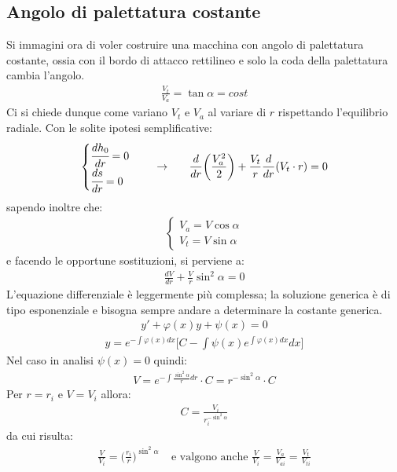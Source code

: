 \subsection{Angolo di palettatura costante}
Si immagini ora di voler costruire una macchina con angolo di palettatura costante, ossia con il bordo di attacco rettilineo e solo la coda della palettatura cambia l'angolo.
\begin{align*}
\boxed{\frac{V_t}{V_a} = \tan \alpha = cost}
\end{align*}
Ci si chiede dunque come variano $V_t$ e $V_a$ al variare di $r$ rispettando l'equilibrio radiale. Con le solite ipotesi semplificative:
\begin{align*}
\begin{cases}
\cfrac{dh_0}{dr} = 0\\
\cfrac{ds}{dr} = 0 
\end{cases} \;\;\;\; \rightarrow \;\;\;\;\;\;
\frac{d}{dr} \bigg(\frac{V_a^2}{2} \bigg) + \frac{V_t}{r} \frac{d}{dr}(V_t \cdot r) = 0
\end{align*}
sapendo inoltre che:
\begin{align*}
\begin{cases}
V_a = V \cos \alpha\\
V_t = V \sin \alpha
\end{cases}
\end{align*}
e facendo le opportune sostituzioni, si perviene a:
\begin{align*}
\frac{dV}{dr} + \frac{V}{r} \sin^2 \alpha = 0
\end{align*}
L'equazione differenziale è leggermente più complessa; la soluzione generica è di tipo esponenziale e bisogna sempre andare a determinare la costante generica.
\begin{align*}
y' + \varphi(x)y + \psi(x) = 0 
\end{align*}
\begin{align*}
y = e^{-\int \varphi(x)dx} \bigg[ C- \int \psi(x) e^{\int \varphi(x)dx} dx \bigg] 
\end{align*}
Nel caso in analisi $\psi(x) = 0$ quindi:
\begin{align*}
V = e^{-\int \frac{\sin^2 \alpha}{r}dr}\cdot C = r^{-\sin^2 \alpha} \cdot C
\end{align*}
Per $r=r_i$ e $V=V_i$ allora:
\begin{align*}
C = \frac{V_i}{r_i^{-\sin^2 \alpha}}
\end{align*}
da cui risulta:
\begin{align*}
	\frac{V}{V_i} = \bigg(\frac{r_i}{r} \bigg)^{\sin^2 \alpha} \;\;\;\; \mbox{e valgono anche } \frac{V}{V_i} =\frac{V_a}{V_{ai}} = \frac{V_t}{V_{ti}}
\end{align*}
